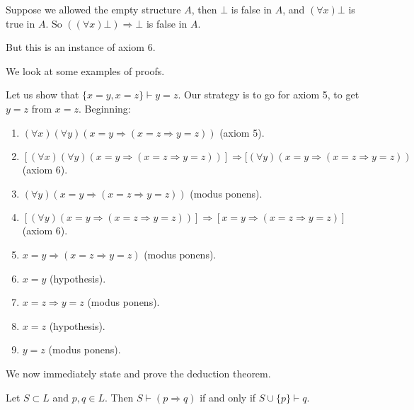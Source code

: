 \documentclass[12pt]{article}
\begin{document}
\begin{remark}
	Suppose we allowed the empty structure $A$, then $\bot$ is false in $A$, and $(\forall x)\bot$ is true in $A$. So $((\forall x) \bot) \Rightarrow \bot$ is false in $A$.

	But this is an instance of axiom $6$.
\end{remark}


We look at some examples of proofs.

\begin{exbox}
	Let us show that $\{x=y,x=z\}\vdash y = z$. Our strategy is to go for axiom 5, to get $y = z$ from $x = z$. Beginning:
	\begin{enumerate}
		\item $(\forall x)(\forall y)(x = y \Rightarrow (x = z \Rightarrow y = z))$ (axiom 5).
		\item $[(\forall x)(\forall y)(x = y \Rightarrow (x = z \Rightarrow y = z))] \Rightarrow [(\forall y)(x = y \Rightarrow (x = z \Rightarrow y = z))$ (axiom 6).
		\item $(\forall y)(x = y \Rightarrow (x = z \Rightarrow y = z))$ (modus ponens).
		\item $[(\forall y)(x = y \Rightarrow (x = z \Rightarrow y = z))] \Rightarrow [x = y \Rightarrow (x = z \Rightarrow y = z)]$ (axiom 6).
		\item $x = y \Rightarrow (x = z \Rightarrow y = z)$ (modus ponens).
		\item $x = y$ (hypothesis).
		\item $x = z \Rightarrow y = z$ (modus ponens).
		\item $x = z$ (hypothesis).
		\item $y = z$ (modus ponens).
	\end{enumerate}
\end{exbox}

We now immediately state and prove the deduction theorem.

\begin{proposition}
	Let $S \subset L$ and $p, q \in L$. Then $S \vdash (p \Rightarrow q)$ if and only if $S \cup \{p\} \vdash q$.
\end{proposition}
\end{document}
